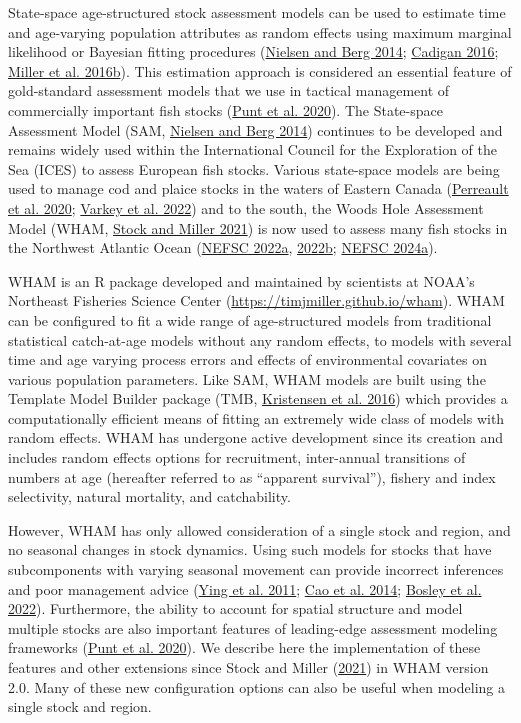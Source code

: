 \documentclass[
]{article}
\begin{document}
State-space age-structured stock assessment models can be used to estimate time and age-varying population attributes as random effects using maximum marginal likelihood or Bayesian fitting procedures (\protect\hyperlink{ref-nielsenberg14}{Nielsen and Berg 2014}; \protect\hyperlink{ref-cadigan16}{Cadigan 2016}; \protect\hyperlink{ref-milleretal16}{Miller et al. 2016b}). This estimation approach is considered an essential feature of gold-standard assessment models that we use in tactical management of commercially important fish stocks (\protect\hyperlink{ref-puntetal20}{Punt et al. 2020}). The State-space Assessment Model (SAM, \protect\hyperlink{ref-nielsenberg14}{Nielsen and Berg 2014}) continues to be developed and remains widely used within the International Council for the Exploration of the Sea (ICES) to assess European fish stocks. Various state-space models are being used to manage cod and plaice stocks in the waters of Eastern Canada (\protect\hyperlink{ref-perreaultetal20}{Perreault et al. 2020}; \protect\hyperlink{ref-varkeyetal22}{Varkey et al. 2022}) and to the south, the Woods Hole Assessment Model (WHAM, \protect\hyperlink{ref-stockmiller21}{Stock and Miller 2021}) is now used to assess many fish stocks in the Northwest Atlantic Ocean (\protect\hyperlink{ref-nefsc22}{NEFSC 2022a}, \protect\hyperlink{ref-nefsc22a}{2022b}; \protect\hyperlink{ref-nefsc24}{NEFSC 2024a}).

WHAM is an R package developed and maintained by scientists at NOAA's Northeast Fisheries Science Center (\url{https://timjmiller.github.io/wham}). WHAM can be configured to fit a wide range of age-structured models from traditional statistical catch-at-age models without any random effects, to models with several time and age varying process errors and effects of environmental covariates on various population parameters. Like SAM, WHAM models are built using the Template Model Builder package (TMB, \protect\hyperlink{ref-kristensenetal16}{Kristensen et al. 2016}) which provides a computationally efficient means of fitting an extremely wide class of models with random effects. WHAM has undergone active development since its creation and includes random effects options for recruitment, inter-annual transitions of numbers at age (hereafter referred to as ``apparent survival''), fishery and index selectivity, natural mortality, and catchability.

However, WHAM has only allowed consideration of a single stock and region, and no seasonal changes in stock dynamics. Using such models for stocks that have subcomponents with varying seasonal movement can provide incorrect inferences and poor management advice (\protect\hyperlink{ref-yingetal11}{Ying et al. 2011}; \protect\hyperlink{ref-caoetal14}{Cao et al. 2014}; \protect\hyperlink{ref-bosleyetal22}{Bosley et al. 2022}). Furthermore, the ability to account for spatial structure and model multiple stocks are also important features of leading-edge assessment modeling frameworks (\protect\hyperlink{ref-puntetal20}{Punt et al. 2020}). We describe here the implementation of these features and other extensions since Stock and Miller (\protect\hyperlink{ref-stockmiller21}{2021}) in WHAM version 2.0. Many of these new configuration options can also be useful when modeling a single stock and region.
\end{document}
